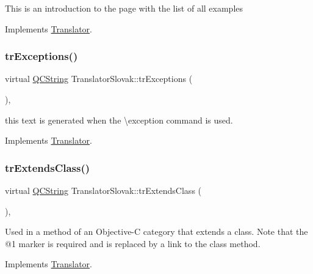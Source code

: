 This is an introduction to the page with the list of all examples 

Implements \mbox{\hyperlink{class_translator}{Translator}}.

\mbox{\label{class_translator_slovak_afc93e4e8d77e7a517b086a9579f44309}} 
\subsubsection{\texorpdfstring{trExceptions()}{trExceptions()}}
{\footnotesize\ttfamily virtual \mbox{\hyperlink{class_q_c_string}{Q\+C\+String}} Translator\+Slovak\+::tr\+Exceptions (\begin{DoxyParamCaption}{ }\end{DoxyParamCaption})\hspace{0.3cm}{\ttfamily [inline]}, {\ttfamily [virtual]}}

this text is generated when the \textbackslash{}exception command is used. 

Implements \mbox{\hyperlink{class_translator}{Translator}}.

\mbox{\label{class_translator_slovak_a6c56fd11337dc4e8557166afc84c4a1e}} 
\subsubsection{\texorpdfstring{trExtendsClass()}{trExtendsClass()}}
{\footnotesize\ttfamily virtual \mbox{\hyperlink{class_q_c_string}{Q\+C\+String}} Translator\+Slovak\+::tr\+Extends\+Class (\begin{DoxyParamCaption}{ }\end{DoxyParamCaption})\hspace{0.3cm}{\ttfamily [inline]}, {\ttfamily [virtual]}}

Used in a method of an Objective-\/C category that extends a class. Note that the @1 marker is required and is replaced by a link to the class method. 

Implements \mbox{\hyperlink{class_translator}{Translator}}.

\mbox{\label{class_translator_slovak_af3c8663ece4491cd719021c9adf92f62}} 
